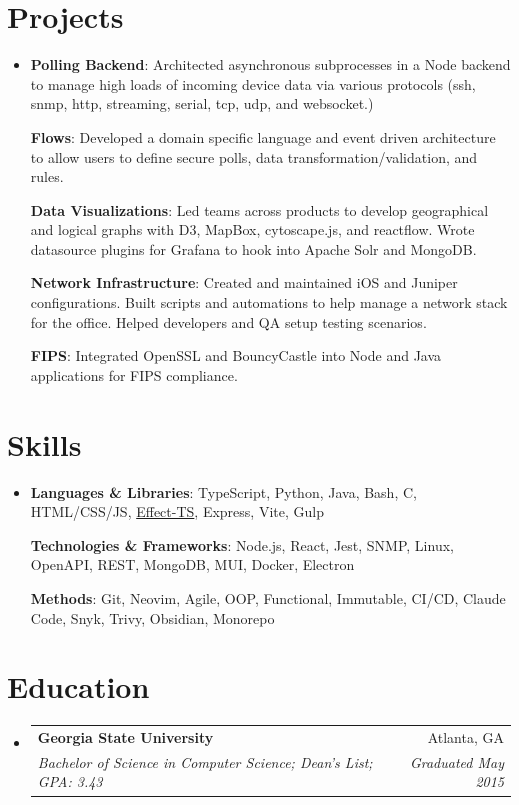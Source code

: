 \documentclass[letterpaper,11pt]{article}
\makeatletter
\newcommand{\resumeSubHeadingListStart}{\begin{itemize}[leftmargin=0.08in, label={}]}
\newcommand{\resumeSubHeadingListEnd}{\end{itemize}}
\newcommand{\resumeSubheadingWithFootnote}[4]{
  \vspace{-5pt}\item
    \begin{tabular*}{0.97\textwidth}[t]{l@{\extracolsep{\fill}}r}
      \textbf{#1} & #2 \vspace{0pt} \\
      \textit{\small#3} & \textit{\small#4} \\
    \end{tabular*}\vspace{-7pt}
}
\newcommand{\boldSubjectWithDesc}[2]{
  \normalsize{\textbf{#1}{: #2 \vspace{-2pt}}}
}
\makeatother
\begin{document}
\section{Projects}
\resumeSubHeadingListStart
\item{
            \boldSubjectWithDesc{Polling Backend}{
              Architected asynchronous subprocesses in a Node backend to manage high loads of incoming device data via various protocols (ssh, snmp, http, streaming, serial, tcp, udp, and websocket.)
            }

            \boldSubjectWithDesc{Flows}{Developed a domain specific language and event driven architecture to allow users to define secure polls, data transformation/validation, and rules.}

            \boldSubjectWithDesc{Data Visualizations}{
              Led teams across products to develop geographical and logical graphs with D3, MapBox, cytoscape.js, and reactflow. Wrote datasource plugins for Grafana to hook into Apache Solr and MongoDB.
            }

            \boldSubjectWithDesc{Network Infrastructure}{Created and maintained iOS and Juniper configurations. Built scripts and automations to help manage a network stack for the office. Helped developers and QA setup testing scenarios.}

            \boldSubjectWithDesc{FIPS}{Integrated OpenSSL and BouncyCastle into Node and Java applications for FIPS compliance.}
      }
\resumeSubHeadingListEnd

\section{Skills}
\resumeSubHeadingListStart
\item{
            \boldSubjectWithDesc{Languages \& Libraries}{TypeScript, Python, Java, Bash, C, HTML/CSS/JS, \href{https://github.com/Effect-TS/effect}{Effect-TS}, Express, Vite, Gulp}

            \boldSubjectWithDesc{Technologies \& Frameworks}{Node.js, React, Jest, SNMP, Linux, OpenAPI, REST, MongoDB, MUI, Docker, Electron}

            \boldSubjectWithDesc{Methods}{Git, Neovim, Agile, OOP, Functional, Immutable, CI/CD, Claude Code, Snyk, Trivy, Obsidian, Monorepo}
      }
\resumeSubHeadingListEnd

\section{Education}
\vspace{2pt}
\resumeSubHeadingListStart
\resumeSubheadingWithFootnote
{Georgia State University}{Atlanta, GA}
{Bachelor of Science in Computer Science; Dean's List; GPA: 3.43}{Graduated May 2015}
\resumeSubHeadingListEnd
\end{document}

